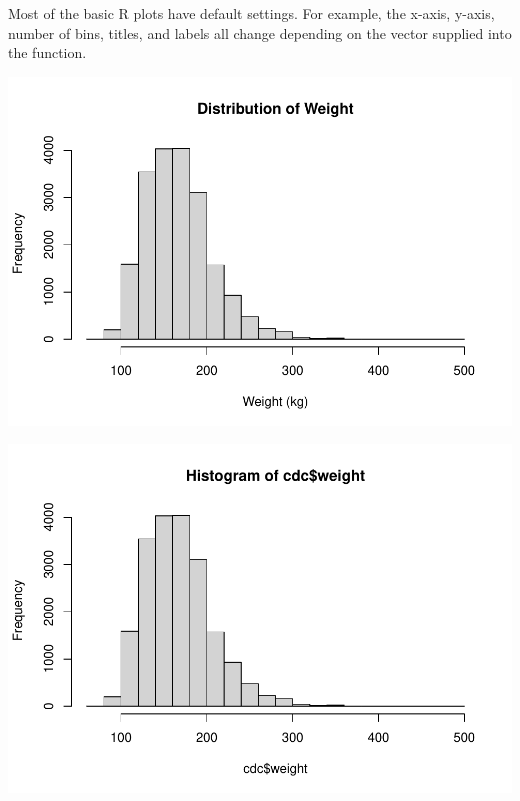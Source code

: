 \documentclass[
]{book}
\newenvironment{Shaded}{\begin{snugshade}}{\end{snugshade}}
\newcommand{\CommentTok}[1]{\textcolor[rgb]{0.56,0.35,0.01}{\textit{#1}}}
\newcommand{\DataTypeTok}[1]{\textcolor[rgb]{0.13,0.29,0.53}{#1}}
\newcommand{\KeywordTok}[1]{\textcolor[rgb]{0.13,0.29,0.53}{\textbf{#1}}}
\newcommand{\NormalTok}[1]{#1}
\newcommand{\OperatorTok}[1]{\textcolor[rgb]{0.81,0.36,0.00}{\textbf{#1}}}
\newcommand{\StringTok}[1]{\textcolor[rgb]{0.31,0.60,0.02}{#1}}
\begin{document}
Most of the basic R plots have default settings. For example, the x-axis, y-axis, number of bins, titles, and labels all change depending on the vector supplied into the function.

\begin{Shaded}
\end{Shaded}

\includegraphics{_main_files/figure-latex/unnamed-chunk-168-1.pdf}

\begin{Shaded}
\end{Shaded}

\includegraphics{_main_files/figure-latex/unnamed-chunk-168-2.pdf}
\end{document}

